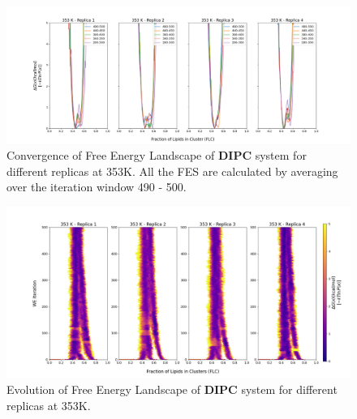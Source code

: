 \documentclass{biophys-new}
\begin{document}
\begin{figure}[hbt!]
\centering
\includegraphics[width=1.1\linewidth]{all_plots/ClusterLipids2Total/DPPC_DIPC_CHOL/353K/Convergence_DIPC_353_ClusterLipids2Total.png}
\caption{Convergence of Free Energy Landscape of \textbf{DIPC} system for different replicas at 353K. All the FES are calculated by averaging over the iteration window 490 - 500.}
\label{fig:view}

\end{figure}

\begin{figure}[hbt!]
\centering
\includegraphics[width=1.1\linewidth]{all_plots/ClusterLipids2Total/DPPC_DIPC_CHOL/353K/Evolution_DIPC_353_ClusterLipids2Total.png}
\caption{Evolution of Free Energy Landscape of \textbf{DIPC} system for different replicas at 353K.}
\label{fig:view}

\end{figure}

\clearpage
\end{document}
